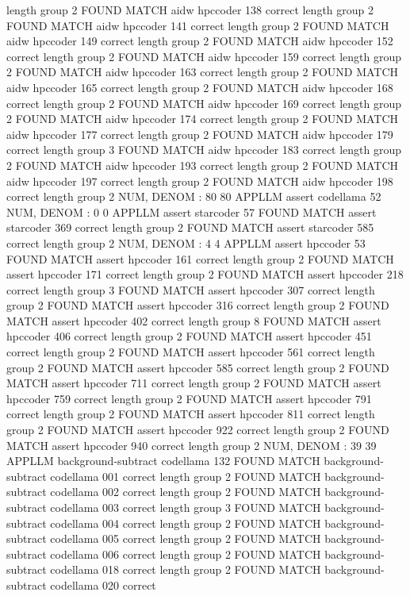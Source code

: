 length group  2
FOUND MATCH aidw hpccoder 138 correct
length group  2
FOUND MATCH aidw hpccoder 141 correct
length group  2
FOUND MATCH aidw hpccoder 149 correct
length group  2
FOUND MATCH aidw hpccoder 152 correct
length group  2
FOUND MATCH aidw hpccoder 159 correct
length group  2
FOUND MATCH aidw hpccoder 163 correct
length group  2
FOUND MATCH aidw hpccoder 165 correct
length group  2
FOUND MATCH aidw hpccoder 168 correct
length group  2
FOUND MATCH aidw hpccoder 169 correct
length group  2
FOUND MATCH aidw hpccoder 174 correct
length group  2
FOUND MATCH aidw hpccoder 177 correct
length group  2
FOUND MATCH aidw hpccoder 179 correct
length group  3
FOUND MATCH aidw hpccoder 183 correct
length group  2
FOUND MATCH aidw hpccoder 193 correct
length group  2
FOUND MATCH aidw hpccoder 197 correct
length group  2
FOUND MATCH aidw hpccoder 198 correct
length group  2
NUM, DENOM : 80 80
APPLLM assert codellama
52
NUM, DENOM : 0 0
APPLLM assert starcoder
57
FOUND MATCH assert starcoder 369 correct
length group  2
FOUND MATCH assert starcoder 585 correct
length group  2
NUM, DENOM : 4 4
APPLLM assert hpccoder
53
FOUND MATCH assert hpccoder 161 correct
length group  2
FOUND MATCH assert hpccoder 171 correct
length group  2
FOUND MATCH assert hpccoder 218 correct
length group  3
FOUND MATCH assert hpccoder 307 correct
length group  2
FOUND MATCH assert hpccoder 316 correct
length group  2
FOUND MATCH assert hpccoder 402 correct
length group  8
FOUND MATCH assert hpccoder 406 correct
length group  2
FOUND MATCH assert hpccoder 451 correct
length group  2
FOUND MATCH assert hpccoder 561 correct
length group  2
FOUND MATCH assert hpccoder 585 correct
length group  2
FOUND MATCH assert hpccoder 711 correct
length group  2
FOUND MATCH assert hpccoder 759 correct
length group  2
FOUND MATCH assert hpccoder 791 correct
length group  2
FOUND MATCH assert hpccoder 811 correct
length group  2
FOUND MATCH assert hpccoder 922 correct
length group  2
FOUND MATCH assert hpccoder 940 correct
length group  2
NUM, DENOM : 39 39
APPLLM background-subtract codellama
132
FOUND MATCH background-subtract codellama 001 correct
length group  2
FOUND MATCH background-subtract codellama 002 correct
length group  2
FOUND MATCH background-subtract codellama 003 correct
length group  3
FOUND MATCH background-subtract codellama 004 correct
length group  2
FOUND MATCH background-subtract codellama 005 correct
length group  2
FOUND MATCH background-subtract codellama 006 correct
length group  2
FOUND MATCH background-subtract codellama 018 correct
length group  2
FOUND MATCH background-subtract codellama 020 correct
